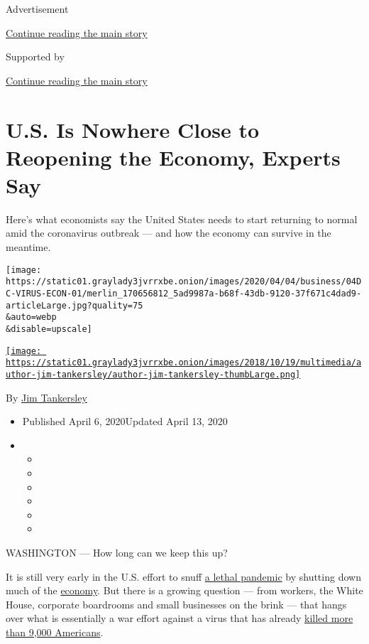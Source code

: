 Advertisement

\protect\hyperlink{after-top}{Continue reading the main story}

Supported by

\protect\hyperlink{after-sponsor}{Continue reading the main story}

\hypertarget{us-is-nowhere-close-to-reopening-the-economy-experts-say}{%
\section{U.S. Is Nowhere Close to Reopening the Economy, Experts
Say}\label{us-is-nowhere-close-to-reopening-the-economy-experts-say}}

Here's what economists say the United States needs to start returning to
normal amid the coronavirus outbreak --- and how the economy can survive
in the meantime.

\texttt{[image: https://static01.graylady3jvrrxbe.onion/images/2020/04/04/business/04DC-VIRUS-ECON-01/merlin\_170656812\_5ad9987a-b68f-43db-9120-37f671c4dad9-articleLarge.jpg?quality=75\\\&auto=webp\\\&disable=upscale]}

\href{https://www.nytimes3xbfgragh.onion/by/jim-tankersley}{\texttt{[image: https://static01.graylady3jvrrxbe.onion/images/2018/10/19/multimedia/author-jim-tankersley/author-jim-tankersley-thumbLarge.png]}}

By \href{https://www.nytimes3xbfgragh.onion/by/jim-tankersley}{Jim
Tankersley}

\begin{itemize}
\item
  Published April 6, 2020Updated April 13, 2020
\item
  \begin{itemize}
  \item
  \item
  \item
  \item
  \item
  \item
  \end{itemize}
\end{itemize}

WASHINGTON --- How long can we keep this up?

It is still very early in the U.S. effort to snuff
\href{https://www.nytimes3xbfgragh.onion/news-event/coronavirus}{a
lethal pandemic} by shutting down much of the
\href{https://www.nytimes3xbfgragh.onion/2020/04/13/business/coronavirus-economy.html}{economy}.
But there is a growing question --- from workers, the White House,
corporate boardrooms and small businesses on the brink --- that hangs
over what is essentially a war effort against a virus that has already
\href{https://coronavirus.jhu.edu/map.html}{killed more than 9,000
Americans}.

